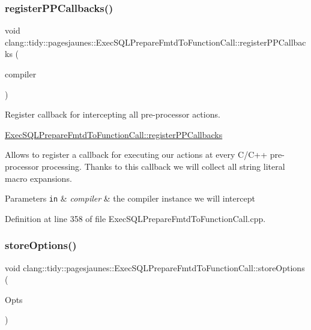\subsubsection{\texorpdfstring{register\+P\+P\+Callbacks()}{registerPPCallbacks()}}
{\footnotesize\ttfamily void clang\+::tidy\+::pagesjaunes\+::\+Exec\+S\+Q\+L\+Prepare\+Fmtd\+To\+Function\+Call\+::register\+P\+P\+Callbacks (\begin{DoxyParamCaption}\item[{Compiler\+Instance \&}]{compiler }\end{DoxyParamCaption})\hspace{0.3cm}{\ttfamily [override]}}



Register callback for intercepting all pre-\/processor actions. 

\hyperlink{classclang_1_1tidy_1_1pagesjaunes_1_1_exec_s_q_l_prepare_fmtd_to_function_call_aa5ea8fe66191404087449262858f2555}{Exec\+S\+Q\+L\+Prepare\+Fmtd\+To\+Function\+Call\+::register\+P\+P\+Callbacks}

Allows to register a callback for executing our actions at every C/\+C++ pre-\/processor processing. Thanks to this callback we will collect all string literal macro expansions.


\begin{DoxyParams}[1]{Parameters}
\mbox{\tt in}  & {\em compiler} & the compiler instance we will intercept \\
\hline
\end{DoxyParams}


Definition at line 358 of file Exec\+S\+Q\+L\+Prepare\+Fmtd\+To\+Function\+Call.\+cpp.

\mbox{\label{classclang_1_1tidy_1_1pagesjaunes_1_1_exec_s_q_l_prepare_fmtd_to_function_call_a34e993981fdc85049c3fa7164f485b4d}} 
\subsubsection{\texorpdfstring{store\+Options()}{storeOptions()}}
{\footnotesize\ttfamily void clang\+::tidy\+::pagesjaunes\+::\+Exec\+S\+Q\+L\+Prepare\+Fmtd\+To\+Function\+Call\+::store\+Options (\begin{DoxyParamCaption}\item[{Clang\+Tidy\+Options\+::\+Option\+Map \&}]{Opts }\end{DoxyParamCaption})\hspace{0.3cm}{\ttfamily [override]}}



